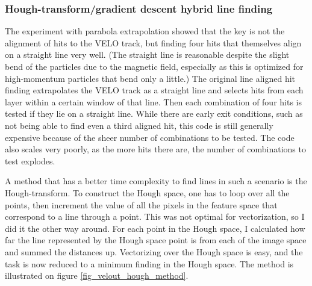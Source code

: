 \documentclass[12pt]{article}
\begin{document}
\subsubsection{Hough-transform/gradient descent hybrid line finding}

The experiment with parabola extrapolation showed that the key is not the alignment of hits to the VELO track, but finding four hits that themselves align on a straight line very well. (The straight line is reasonable despite the slight bend of the particles due to the magnetic field, especially as this is optimized for high-momentum particles that bend only a little.) The original line aligned hit finding extrapolates the VELO track as a straight line and selects hits from each layer within a certain window of that line. Then each combination of four hits is tested if they lie on a straight line. While there are early exit conditions, such as not being able to find even a third aligned hit, this code is still generally expensive because of the sheer number of combinations to be tested. The code also scales very poorly, as the more hits there are, the number of combinations to test explodes.
\vspace{1pc}

A method that has a better time complexity to find lines in such a scenario is the Hough-transform\cite{wiki_hough_transform}. To construct the Hough space, one has to loop over all the points, then increment the value of all the pixels in the feature space that correspond to a line through a point. This was not optimal for vectorization, so I did it the other way around. For each point in the Hough space, I calculated how far the line represented by the Hough space point is from each of the image space and summed the distances up. Vectorizing over the Hough space is easy, and the task is now reduced to a minimum finding in the Hough space. The method is illustrated on figure \ref{fig_velout_hough_method}.
\end{document}

